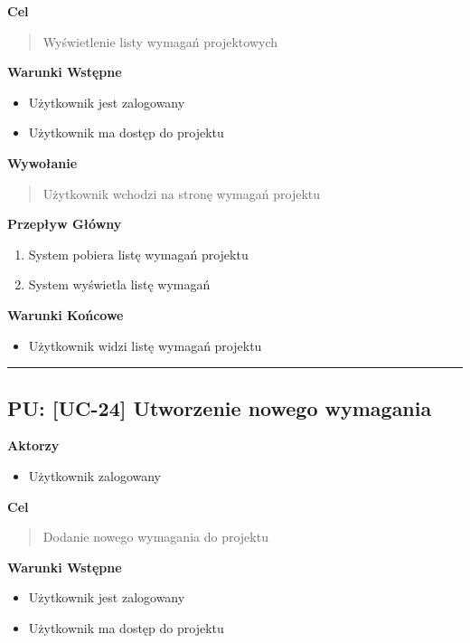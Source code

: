 \vspace{0.2cm}
\noindent\textbf{Cel}
\begin{quote}
    Wyświetlenie listy wymagań projektowych
\end{quote}

\vspace{0.2cm}
\noindent\textbf{Warunki Wstępne}
\begin{itemize}
    \item Użytkownik jest zalogowany
    \item Użytkownik ma dostęp do projektu
\end{itemize}

\vspace{0.2cm}
\noindent\textbf{Wywołanie}
\begin{quote}
    Użytkownik wchodzi na stronę wymagań projektu
\end{quote}

\vspace{0.2cm}
\noindent\textbf{Przepływ Główny}
\begin{enumerate}
    \item System pobiera listę wymagań projektu
    \item System wyświetla listę wymagań
\end{enumerate}

\vspace{0.2cm}
\noindent\textbf{Warunki Końcowe}
\begin{itemize}
    \item Użytkownik widzi listę wymagań projektu
\end{itemize}


\hrule
\vspace{1cm}

\subsection*{PU: [UC-24] Utworzenie nowego wymagania}

\noindent\textbf{Aktorzy}
\begin{itemize}
    \item Użytkownik zalogowany
\end{itemize}

\vspace{0.2cm}
\noindent\textbf{Cel}
\begin{quote}
    Dodanie nowego wymagania do projektu
\end{quote}

\vspace{0.2cm}
\noindent\textbf{Warunki Wstępne}
\begin{itemize}
    \item Użytkownik jest zalogowany
    \item Użytkownik ma dostęp do projektu
\end{itemize}

